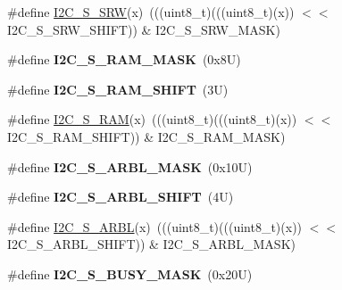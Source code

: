 \begin{DoxyCompactItemize}
\item 
\#define \mbox{\hyperlink{group___i2_c___register___masks_ga3c251f26dc02eecdb65829e45b9830d1}{I2\+C\+\_\+\+S\+\_\+\+S\+RW}}(x)~(((uint8\+\_\+t)(((uint8\+\_\+t)(x)) $<$$<$ I2\+C\+\_\+\+S\+\_\+\+S\+R\+W\+\_\+\+S\+H\+I\+FT)) \& I2\+C\+\_\+\+S\+\_\+\+S\+R\+W\+\_\+\+M\+A\+SK)
\item 
\mbox{\label{group___i2_c___register___masks_ga8176df0a3138ff19cc2551531d61fb2c}} 
\#define {\bfseries I2\+C\+\_\+\+S\+\_\+\+R\+A\+M\+\_\+\+M\+A\+SK}~(0x8\+U)
\item 
\mbox{\label{group___i2_c___register___masks_ga8e3ed53ea2a04e7a0d0a2d0654fb74fd}} 
\#define {\bfseries I2\+C\+\_\+\+S\+\_\+\+R\+A\+M\+\_\+\+S\+H\+I\+FT}~(3\+U)
\item 
\#define \mbox{\hyperlink{group___i2_c___register___masks_ga47a3e85124417d95a731713c96785054}{I2\+C\+\_\+\+S\+\_\+\+R\+AM}}(x)~(((uint8\+\_\+t)(((uint8\+\_\+t)(x)) $<$$<$ I2\+C\+\_\+\+S\+\_\+\+R\+A\+M\+\_\+\+S\+H\+I\+FT)) \& I2\+C\+\_\+\+S\+\_\+\+R\+A\+M\+\_\+\+M\+A\+SK)
\item 
\mbox{\label{group___i2_c___register___masks_ga5f4949ee45450ae24a9885c8a0b5b71d}} 
\#define {\bfseries I2\+C\+\_\+\+S\+\_\+\+A\+R\+B\+L\+\_\+\+M\+A\+SK}~(0x10\+U)
\item 
\mbox{\label{group___i2_c___register___masks_ga6401a3c073bca30cd0f01ce830bc2734}} 
\#define {\bfseries I2\+C\+\_\+\+S\+\_\+\+A\+R\+B\+L\+\_\+\+S\+H\+I\+FT}~(4\+U)
\item 
\#define \mbox{\hyperlink{group___i2_c___register___masks_ga1b03d34de44807673dd516609532885d}{I2\+C\+\_\+\+S\+\_\+\+A\+R\+BL}}(x)~(((uint8\+\_\+t)(((uint8\+\_\+t)(x)) $<$$<$ I2\+C\+\_\+\+S\+\_\+\+A\+R\+B\+L\+\_\+\+S\+H\+I\+FT)) \& I2\+C\+\_\+\+S\+\_\+\+A\+R\+B\+L\+\_\+\+M\+A\+SK)
\item 
\mbox{\label{group___i2_c___register___masks_ga2e9a4cd81bee477ce0bb8f04dde5a836}} 
\#define {\bfseries I2\+C\+\_\+\+S\+\_\+\+B\+U\+S\+Y\+\_\+\+M\+A\+SK}~(0x20\+U)
\item 
\mbox{\label{group___i2_c___register___masks_gaf449f97abe53ded41a8cd83691089af7}} 
$$
\end{DoxyCompactItemize}
